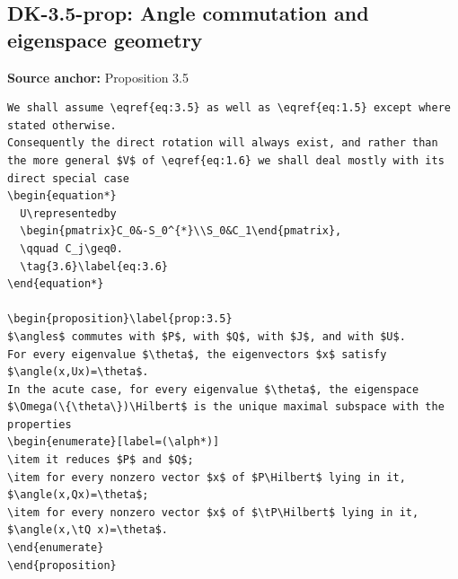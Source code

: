 \subsection*{DK-3.5-prop: Angle commutation and eigenspace geometry}
\noindent\textbf{Source anchor:} Proposition 3.5\\
\begin{verbatim}
We shall assume \eqref{eq:3.5} as well as \eqref{eq:1.5} except where stated otherwise.
Consequently the direct rotation will always exist, and rather than the more general $V$ of \eqref{eq:1.6} we shall deal mostly with its direct special case
\begin{equation*}
  U\representedby
  \begin{pmatrix}C_0&-S_0^{*}\\S_0&C_1\end{pmatrix},
  \qquad C_j\geq0.
  \tag{3.6}\label{eq:3.6}
\end{equation*}

\begin{proposition}\label{prop:3.5}
$\angles$ commutes with $P$, with $Q$, with $J$, and with $U$.
For every eigenvalue $\theta$, the eigenvectors $x$ satisfy $\angle(x,Ux)=\theta$.
In the acute case, for every eigenvalue $\theta$, the eigenspace $\Omega(\{\theta\})\Hilbert$ is the unique maximal subspace with the properties
\begin{enumerate}[label=(\alph*)]
\item it reduces $P$ and $Q$;
\item for every nonzero vector $x$ of $P\Hilbert$ lying in it, $\angle(x,Qx)=\theta$;
\item for every nonzero vector $x$ of $\tP\Hilbert$ lying in it, $\angle(x,\tQ x)=\theta$.
\end{enumerate}
\end{proposition}
\end{verbatim}

